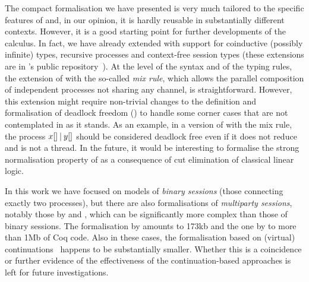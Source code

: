 The compact formalisation we have presented is very much tailored to the
specific features of \Calculus and, in our opinion, it is hardly reusable in
substantially different contexts.
%
However, it is a good starting point for further developments of the \LCC
calculus. In fact, we have already extended \LCC with support for coinductive
(\ie possibly infinite) types, recursive processes and context-free session
types (these extensions are in \LCC's public
repository~\cite{PadovaniRaffaelli25}).
%
At the level of the syntax and of the typing rules, the extension of \LCC with
the so-called \emph{mix rule}, which allows the parallel composition of
independent processes not sharing any channel, is straightforward. However, this
extension might require non-trivial changes to the definition and formalisation
of deadlock freedom () to handle some corner
cases that are not contemplated in \LCC as it stands. As an example, in a
version of \LCC with the mix rule, the process $x[] \mathbin| y[]$ should
be considered deadlock free even if it does not reduce and is not a thread.
%
In the future, it would be interesting
to formalise the strong normalisation property of \LCC as a consequence of cut
elimination of classical linear logic.

In this work we have focused on models of \emph{binary sessions} (those
connecting exactly two processes), but there are also formalisations of
\emph{multiparty sessions}, notably those by \citet{JacobsBalzerKrebbers22a} and
\citet{TiroreBengstonCarbone25}, which can be significantly more complex than
those of binary sessions. The formalisation by \citet{JacobsBalzerKrebbers22a}
amounts to 173kb and the one by \citet{TiroreBengstonCarbone25} to more than 1Mb
of Coq code. Also in these cases, the formalisation based on (virtual)
continuations~\citep{JacobsBalzerKrebbers22a} happens to be substantially
smaller. Whether this is a coincidence or further evidence of the effectiveness
of the continuation-based approaches is left for future investigations.
